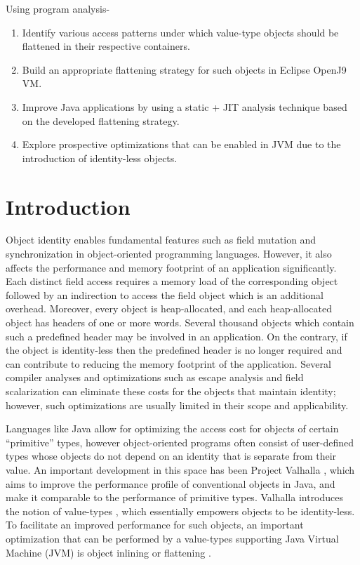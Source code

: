 \documentclass[12 pt, a4paper]{article}
\begin{document}
Using program analysis-
\begin{enumerate}
\item Identify various access patterns under which value-type objects should be flattened in their respective containers.
\item Build an appropriate flattening strategy for such objects in Eclipse OpenJ9 VM.
\item Improve Java applications by using a static + JIT analysis technique based on the developed flattening strategy.
\item Explore prospective optimizations that can be enabled in JVM due to the introduction of identity-less objects.

\end{enumerate} 

\section{Introduction}
Object identity enables fundamental features such as field mutation and synchronization in 
object-oriented programming languages.
However, it also affects the performance and memory footprint of an application significantly. 
Each distinct field access requires a memory load of the corresponding object followed by an 
indirection to access the field object which is an additional overhead.
Moreover, every object is heap-allocated, and each heap-allocated object has headers of one or 
more words. Several thousand objects which contain such a predefined header may be involved 
in an application. On the contrary, if the object is 
identity-less then the predefined header is no longer required and can contribute to reducing the 
memory footprint of the application.  Several compiler
analyses and optimizations such as escape analysis and field scalarization can eliminate 
these costs for the objects that maintain identity; however,
such optimizations are usually limited in their scope and applicability.


	Languages like Java allow for optimizing the access cost for
objects of certain “primitive” types, however object-oriented programs often
consist of user-defined types whose objects do not depend
on an identity that is separate from their value. An important
development in this space has been Project Valhalla \citep{PV}, which
aims to improve the performance profile of conventional objects in
Java, and make it comparable to the performance of primitive types.
Valhalla introduces the notion of value-types \citep{JEPD}, which essentially
empowers objects to be identity-less. To facilitate an improved 
performance for such objects, an important optimization
that can be performed by a value-types supporting Java Virtual
Machine (JVM) is object inlining or flattening \citep{ObjectInlining}.
\end{document}
